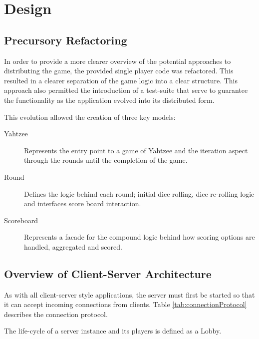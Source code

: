 \section{Design}
\subsection{Precursory Refactoring}

In order to provide a more clearer overview of the potential approaches to distributing the game, the provided single player code was refactored. This resulted in a clearer separation of the game logic into a clear structure. This approach also permitted the introduction of a test-suite that serve to guarantee the functionality as the application evolved into its distributed form.

This evolution allowed the creation of three key models: 

\begin{description}
	\item [Yahtzee]  Represents the entry point to a game of Yahtzee and the iteration aspect through the rounds until the completion of the game.
	\item [Round] Defines the logic behind each round; initial dice rolling, dice re-rolling logic and interfaces score board interaction.
	\item [Scoreboard] Represents a facade for the compound logic behind how scoring options are handled, aggregated and scored.
\end{description}

\subsection{Overview of Client-Server Architecture}

As with all client-server style applications, the server must first be started so that it can accept incoming connections from clients. Table \ref{tab:connectionProtocol} describes the connection protocol.

The life-cycle of a server instance and its players is defined as a Lobby. 

